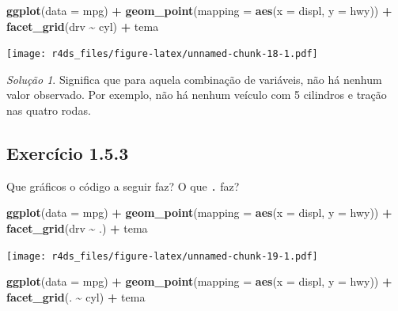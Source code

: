 \documentclass[
]{latex/krantz}
\newenvironment{Shaded}{\begin{snugshade}}{\end{snugshade}}
\newcommand{\AttributeTok}[1]{\textcolor[rgb]{0.13,0.29,0.53}{#1}}
\newcommand{\FunctionTok}[1]{\textcolor[rgb]{0.13,0.29,0.53}{\textbf{#1}}}
\newcommand{\NormalTok}[1]{#1}
\newcommand{\SpecialCharTok}[1]{\textcolor[rgb]{0.81,0.36,0.00}{\textbf{#1}}}
\theoremstyle{definition}
\theoremstyle{definition}
\theoremstyle{definition}
\theoremstyle{definition}
\theoremstyle{remark}
\newtheorem*{solution}{Solução}
\begin{document}
\begin{Shaded}
\begin{Highlighting}[]
\FunctionTok{ggplot}\NormalTok{(}\AttributeTok{data =}\NormalTok{ mpg) }\SpecialCharTok{+}
    \FunctionTok{geom\_point}\NormalTok{(}\AttributeTok{mapping =} \FunctionTok{aes}\NormalTok{(}\AttributeTok{x =}\NormalTok{ displ, }\AttributeTok{y =}\NormalTok{ hwy)) }\SpecialCharTok{+}
    \FunctionTok{facet\_grid}\NormalTok{(drv }\SpecialCharTok{\textasciitilde{}}\NormalTok{ cyl) }\SpecialCharTok{+}
\NormalTok{    tema}
\end{Highlighting}
\end{Shaded}

\texttt{[image: r4ds\_files/figure-latex/unnamed-chunk-18-1.pdf]}

\begin{solution}
Significa que para aquela combinação de variáveis, não há nenhum valor observado. Por exemplo, não há nenhum veículo com 5 cilindros e tração nas quatro rodas.
\end{solution}

\hypertarget{exr1-5-3}{%
\subsection*{Exercício 1.5.3}\label{exr1-5-3}}

Que gráficos o código a seguir faz? O que \texttt{.} faz?

\begin{Shaded}
\begin{Highlighting}[]
\FunctionTok{ggplot}\NormalTok{(}\AttributeTok{data =}\NormalTok{ mpg) }\SpecialCharTok{+}
    \FunctionTok{geom\_point}\NormalTok{(}\AttributeTok{mapping =} \FunctionTok{aes}\NormalTok{(}\AttributeTok{x =}\NormalTok{ displ, }\AttributeTok{y =}\NormalTok{ hwy)) }\SpecialCharTok{+}
    \FunctionTok{facet\_grid}\NormalTok{(drv }\SpecialCharTok{\textasciitilde{}}\NormalTok{ .) }\SpecialCharTok{+}
\NormalTok{    tema}
\end{Highlighting}
\end{Shaded}

\texttt{[image: r4ds\_files/figure-latex/unnamed-chunk-19-1.pdf]}

\begin{Shaded}
\begin{Highlighting}[]
\FunctionTok{ggplot}\NormalTok{(}\AttributeTok{data =}\NormalTok{ mpg) }\SpecialCharTok{+}
    \FunctionTok{geom\_point}\NormalTok{(}\AttributeTok{mapping =} \FunctionTok{aes}\NormalTok{(}\AttributeTok{x =}\NormalTok{ displ, }\AttributeTok{y =}\NormalTok{ hwy)) }\SpecialCharTok{+}
    \FunctionTok{facet\_grid}\NormalTok{(. }\SpecialCharTok{\textasciitilde{}}\NormalTok{ cyl) }\SpecialCharTok{+}
\NormalTok{    tema}
\end{Highlighting}
\end{Shaded}
\end{document}
